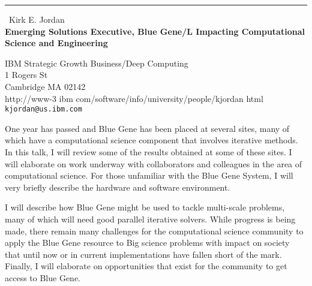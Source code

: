 \documentclass{report}
\begin{document}
\begin{center}
\rule{6in}{1pt} \
{\large Kirk E. Jordan \\
{\bf Emerging Solutions Executive, Blue Gene/L Impacting Computational Science and Engineering }}

IBM Strategic Growth Business/Deep Computing \\ 1 Rogers St \\ Cambridge MA 02142 \\ http://www-3 ibm com/software/info/university/people/kjordan html
\\
{\tt kjordan@us.ibm.com}\end{center}

One year has passed and Blue Gene has been placed at
several sites, many of which have a computational science component
that involves iterative methods. In this talk, I will review some of
the results obtained at some of these sites. I will elaborate on work
underway with collaborators and colleagues in the area of
computational science. For those unfamiliar with the Blue Gene
System, I will very briefly describe the hardware and software
environment.

I will describe how Blue Gene might be used to tackle
multi-scale problems, many of which will need good parallel iterative
solvers. While progress is being made, there remain many challenges
for the computational science community to apply the Blue Gene
resource to Big science problems with impact on society that until now
or in current implementations have fallen short of the mark. Finally,
I will elaborate on opportunities that exist for the community to get
access to Blue Gene.
\end{document}
